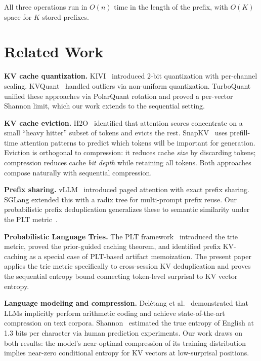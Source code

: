\documentclass[11pt]{article}
\begin{document}
All three operations run in $O(n)$ time in the length of the prefix, with
$O(K)$ space for $K$ stored prefixes.

\section{Related Work}
\label{sec:related}

\textbf{KV cache quantization.}
KIVI~\cite{liu2024kivi} introduced 2-bit quantization with per-channel scaling.
KVQuant~\cite{hooper2024kvquant} handled outliers via non-uniform quantization.
TurboQuant~\cite{turbo2026} unified these approaches via PolarQuant rotation and
proved a per-vector Shannon limit, which our work extends to the sequential setting.

\textbf{KV cache eviction.}
H2O~\cite{zhang2023h2o} identified that attention scores concentrate on a small
``heavy hitter'' subset of tokens and evicts the rest.  SnapKV~\cite{li2024snapkv}
uses prefill-time attention patterns to predict which tokens will be important
for generation.  Eviction is orthogonal to compression: it reduces cache \emph{size}
by discarding tokens; compression reduces cache \emph{bit depth} while retaining
all tokens.  Both approaches compose naturally with sequential compression.

\textbf{Prefix sharing.}
vLLM~\cite{kwon2023vllm} introduced paged attention with exact prefix sharing.
SGLang extended this with a radix tree for multi-prompt prefix reuse.
Our probabilistic prefix deduplication generalizes these to semantic similarity
under the PLT metric~\cite{plt2026}.

\textbf{Probabilistic Language Tries.}
The PLT framework~\cite{plt2026} introduced the trie metric, proved the
prior-guided caching theorem, and identified prefix KV-caching as a special
case of PLT-based artifact memoization.  The present paper applies the trie
metric specifically to cross-session KV deduplication and proves the sequential
entropy bound connecting token-level surprisal to KV vector entropy.

\textbf{Language modeling and compression.}
Delétang et al.~\cite{deletang2023} demonstrated that LLMs implicitly perform
arithmetic coding and achieve state-of-the-art compression on text corpora.
Shannon~\cite{shannon1951} estimated the true entropy of English at 1.3 bits
per character via human prediction experiments.  Our work draws on both results:
the model's near-optimal compression of its training distribution implies
near-zero conditional entropy for KV vectors at low-surprisal positions.
\end{document}
